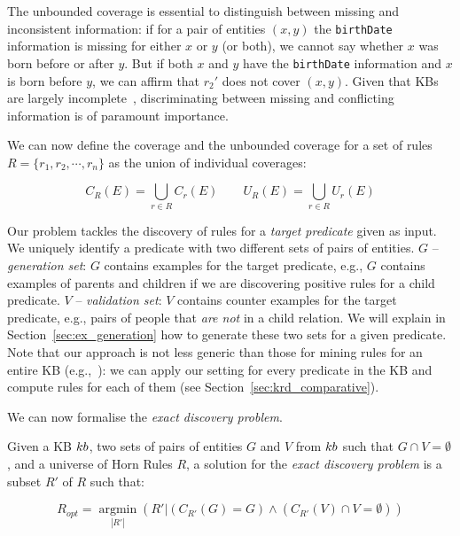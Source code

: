 \vspace{0.5ex}
The unbounded coverage is essential to distinguish between missing and inconsistent information: if for a pair of entities $(x,y)$ the \texttt{birthDate} information is missing for either $x$ or $y$ (or both), we cannot say whether $x$ was born before or after $y$. 
But if both $x$ and $y$ have the \texttt{birthDate} information and $x$ is born before $y$, we can affirm that $r_2'$ does not cover $(x,y)$. Given that KBs are largely incomplete~\cite{min2013distant}, discriminating between missing and conflicting information is of paramount importance.

We can now define the coverage and the unbounded coverage for a set of rules $R=\{r_1,r_2,\cdots,r_n\}$ as the union of individual coverages:


\vspace{-4mm}	
\begin{equation*}
	C_R(E) = \bigcup \limits_{r \in R} C_r(E) \qquad U_R(E) = \bigcup \limits_{r \in R} U_r(E) 	\end{equation*}
\vspace{-2mm}

Our problem tackles the discovery of %
rules for a {\em target predicate} given as input. We uniquely identify a predicate with two different sets of pairs of entities.
$G$ -- \emph{generation set}: $G$ contains examples for the target predicate, e.g., $G$ contains examples of parents and children if we are discovering positive rules for a child predicate.
$V$ -- \emph{validation set}: $V$ contains counter examples for the target predicate, e.g., pairs of people that {\em are not} in a child relation.
We will explain in Section~\ref{sec:ex_generation} how to generate these two sets for a given predicate. Note that our approach is not less generic than those for mining rules for an entire KB (e.g.,~\cite{abedjan2014amending,galarraga2015fast}): 
we can apply our setting for every predicate in the KB and compute rules for each of them (see Section~\ref{sec:krd_comparative}).

We can now formalise the \emph{exact discovery problem}.
\begin{definition}
	Given a KB ${\sc kb}$, two sets of pairs of entities $G$ and $V$ from ${\sc kb}$ such that $G \cap V = \emptyset$, and a universe of Horn Rules $R$, a solution for the \emph{exact discovery problem} is a subset $R'$ of $R$  such that:
	
	\vspace{-4mm}	
	\begin{equation*}
		R_{opt}=\underset{|R'|}{\operatorname{argmin}}(R'|(C_{R'}(G) = G) \wedge (C_{R'}(V) \cap V = \emptyset) )	\end{equation*}
	
\end{definition}

